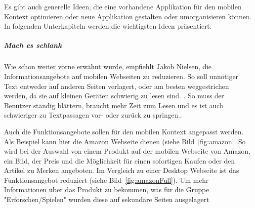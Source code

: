 Es gibt auch generelle Ideen, die eine vorhandene Applikation für den mobilen Kontext optimieren oder neue Applikation gestalten oder umorganisieren können. In folgenden Unterkapiteln werden die wichtigsten Ideen präsentiert. 

\subparagraph{Mach es schlank} 
\label{subp:entferne_das_fett}

Wie schon weiter vorne erwähnt wurde, empfiehlt Jakob Nielsen, die Informationsangebote auf mobilen Webseiten zu reduzieren. So soll unnötiger Text entweder auf anderen Seiten verlagert, oder am besten weggestrichen werden, da sie auf kleinen Geräten schwierig zu lesen sind. \cite[Seite 102]{Nielsen:2012wj}. So muss der Benutzer ständig blättern, braucht mehr Zeit zum Lesen und es ist auch schwieriger zu Textpassagen vor- oder zurück zu springen..

Auch die Funktionsangebote sollen für den mobilen Kontext angepasst werden. Als Beispiel kann hier die Amazon Webseite dienen (siehe Bild~\ref{fig:amazon}. So wird bei der Auswahl von einem Produkt auf der mobilen Webseite von Amazon, ein Bild, der Preis und die Möglichkeit für einen sofortigen Kaufen oder den Artikel zu Merken angeboten. Im Vergleich zu einer Desktop Webseite ist das  Funktionsangebot reduziert (siehe Bild~\ref{fig:amazonFull}). Um mehr Informationen über das Produkt zu bekommen, was für die Gruppe "Erforschen/Spielen" wurden diese auf sekundäre Seiten ausgelagert

